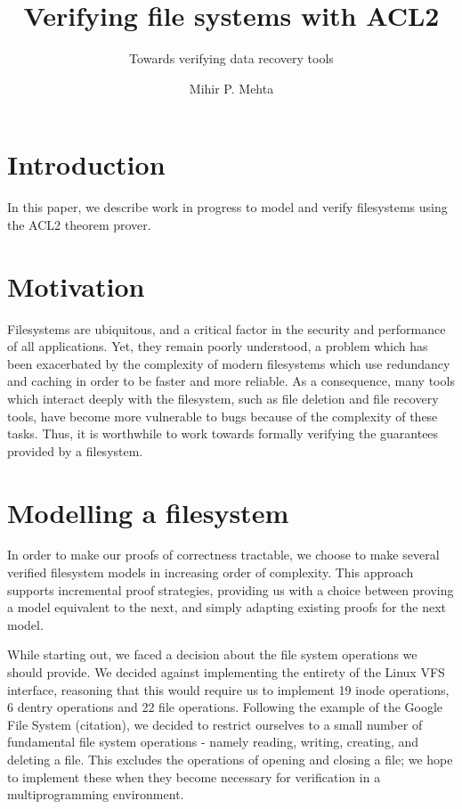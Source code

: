 \documentclass[format=sigconf,review=true]{acmart}
\title{Verifying file systems with ACL2}
\subtitle{Towards verifying data recovery tools}
\author{Mihir P. Mehta}
\affiliation{%
  \institution{University of Texas at Austin}
  \city{Austin}
  \state{TX}
  \country{USA}}
\begin{document}
\lstset{language=Lisp}

\maketitle

\section{Introduction}

In this paper, we describe work in progress to model and verify
filesystems using the ACL2 theorem prover.

\section{Motivation}
Filesystems are ubiquitous, and a critical factor in the security and
performance of all applications. Yet, they remain poorly understood,
a problem which has been exacerbated by the complexity of modern
filesystems which use redundancy and caching in order to be faster and
more reliable. As a consequence, many tools which interact deeply with
the filesystem, such as file deletion and file recovery tools, have
become more vulnerable to bugs because of the complexity of these
tasks. Thus, it is worthwhile to work towards formally verifying the
guarantees provided by a filesystem.

\section{Modelling a filesystem}

In order to make our proofs of correctness tractable, we choose to
make several verified filesystem models in increasing order of
complexity. This approach supports incremental proof strategies,
providing us with a choice between proving a model equivalent to the
next, and simply adapting existing proofs for the next model.

While starting out, we faced a decision about the file system
operations we should provide. We decided against implementing the
entirety of the Linux VFS interface, reasoning that this would require
us to implement 19 inode operations, 6 dentry operations and 22 file
operations. Following the  example of the Google File System
(citation), we decided to restrict ourselves to a small
number of fundamental file system operations - namely reading, writing,
creating, and deleting a file. This excludes the operations of opening
and closing a file; we hope to implement these when they become
necessary for verification in a multiprogramming environment.
\end{document}
